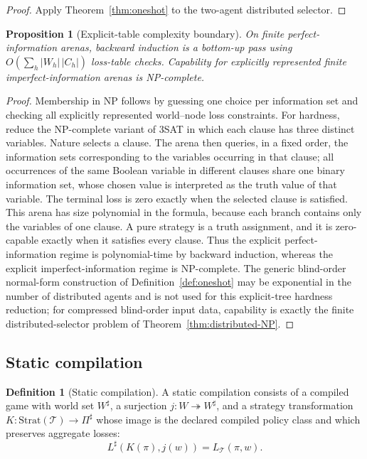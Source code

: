 \documentclass[11pt]{article}
\theoremstyle{plain}
\newtheorem{proposition}[theorem]{Proposition}
\theoremstyle{definition}
\newtheorem{definition}[theorem]{Definition}
\theoremstyle{remark}
\begin{document}
\begin{proof}
Apply Theorem~\ref{thm:oneshot} to the two-agent distributed selector.
\end{proof}

\begin{proposition}[Explicit-table complexity boundary]\label{prop:pnp}
On finite perfect-information arenas, backward induction is a bottom-up pass
using $O(\sum_h|W_h|\,|C_h|)$ loss-table checks. Capability for explicitly
represented finite imperfect-information arenas is NP-complete.
\end{proposition}

\begin{proof}
Membership in NP follows by guessing one choice per information set and checking
all explicitly represented world--node loss constraints. For hardness, reduce the NP-complete variant of 3SAT in which each clause has
three distinct variables. Nature selects a clause. The arena then queries, in a
fixed order, the information sets corresponding to the variables occurring in
that clause;
all occurrences of the same Boolean variable in different clauses share one
binary information set, whose chosen value is interpreted as the truth value of
that variable. The terminal loss is zero exactly when the selected clause is
satisfied. This arena has size polynomial in the formula, because each branch
contains only the variables of one clause. A pure strategy is a truth assignment,
and it is zero-capable exactly when it satisfies every clause. Thus the explicit
perfect-information regime is polynomial-time by backward induction, whereas the
explicit imperfect-information regime is NP-complete. The generic blind-order
normal-form construction of Definition~\ref{def:oneshot} may be exponential in
the number of distributed agents and is not used for this explicit-tree hardness
reduction; for compressed blind-order input data, capability is exactly the
finite distributed-selector problem of Theorem~\ref{thm:distributed-NP}.
\end{proof}




\subsection{Static compilation}

\begin{definition}[Static compilation]\label{def:staticcomp}
A static compilation consists of a compiled game with world set $W^\sharp$, a
surjection $j:W\twoheadrightarrow W^\sharp$, and a strategy transformation
$K:\mathrm{Strat}(\mathcal T)\to\Pi^\sharp$ whose image is the declared
compiled policy class and which preserves aggregate losses:
\[
L^\sharp(K(\pi),j(w))=L_{\mathcal T}(\pi,w).
\]
\end{definition}
\end{document}
